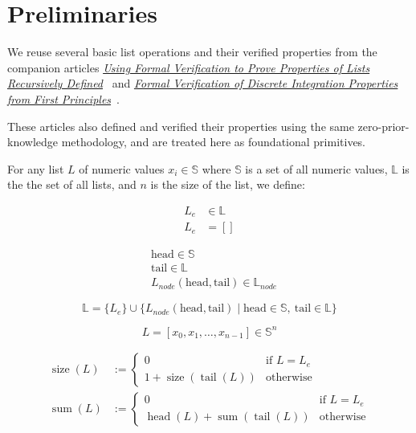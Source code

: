 \section{Preliminaries}

We reuse several basic list operations and their verified properties from the
companion articles \href{https://rxiverse.org/abs/2609.0023}{\emph{Using Formal Verification to Prove Properties of Lists Recursively Defined}}~\cite{mata2026lists}
and \href{https://doi.org/10.5281/zenodo.22746792}{\emph{Formal Verification of Discrete Integration Properties from First Principles}}~\cite{mata2026integral}.

These articles also defined and verified their properties using the same
zero-prior-knowledge methodology, and are treated here as foundational
primitives.

For any list $L$ of numeric values $x_i \in \mathbb{S}$ where $\mathbb{S}$ is
a set of all numeric values, $\mathbb{L}$ is the the set of all lists, and $n$
is the size of the list, we define:

\begin{equation*}
\begin{aligned}
L_e &\in \mathbb{L} \\
L_e &= []
\end{aligned}
\end{equation*}

\begin{equation*}
\begin{aligned}
&\text{head} \in \mathbb{S} \\
&\text{tail} \in \mathbb{L} \\
&L_{node}(\text{head}, \text{tail}) \in \mathbb{L}_{node}
\end{aligned}
\end{equation*}

\begin{equation*}
\mathbb{L} = \{L_e\} \cup
\{L_{node}(\text{head}, \text{tail})
\mid \text{head} \in \mathbb{S},\ \text{tail} \in \mathbb{L}\}
\end{equation*}

\begin{equation*}
L = [x_0, x_1, \dots, x_{n-1}] \in \mathbb{S}^n
\end{equation*}

\begin{equation*}
\begin{aligned}
\operatorname{size}(L) &:=
\begin{cases}
0 & \text{if } L = L_e \\
1 + \operatorname{size}(\operatorname{tail}(L)) & \text{otherwise}
\end{cases} \\
\operatorname{sum}(L) &:=
\begin{cases}
0 & \text{if } L = L_e \\
\operatorname{head}(L) + \operatorname{sum}(\operatorname{tail}(L))
  & \text{otherwise}
\end{cases}
\end{aligned}
\end{equation*}

